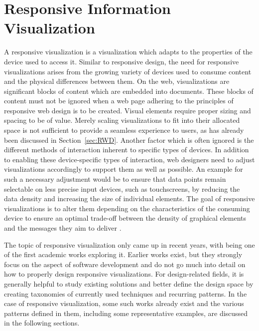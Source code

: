 \chapter{Responsive Information Visualization}

A responsive visualization is a visualization which adapts to the properties of the device used to access it.
Similar to responsive design, the need for responsive visualizations arises from the growing variety of devices used to consume content and the physical differences between them.
On the web, visualizations are significant blocks of content which are embedded into documents.
These blocks of content must not be ignored when a web page adhering to the principles of responsive web design is to be created.
Visual elements require proper sizing and spacing to be of value.
Merely scaling visualizations to fit into their allocated space is not sufficient to provide a seamless experience to users, as has already been discussed in Section~\ref{sec:RWD}.
Another factor which is often ignored is the different methods of interaction inherent to specific types of devices.
In addition to enabling these device-specific types of interaction, web designers need to adjust visualizations accordingly to support them as well as possible.
An example for such a necessary adjustment would be to ensure that data points remain selectable on less precise input devices, such as touchscreens, by reducing the data density and increasing the size of individual elements.
The goal of responsive visualizations is to alter them depending on the characteristics of the consuming device to ensure an optimal trade-off between the density of graphical elements and the messages they aim to deliver \parencite{DesignPatternsTradeOffsRespVis}. 

The topic of responsive visualization only came up in recent years, with \cite{RespVis} being one of the first academic works exploring it.
Earlier works \parencite{BuildingRespDataVisForTheWeb,LearningRespDataVis} exist, but they strongly focus on the aspect of software development and do not go much into detail on how to properly design responsive visualizations.
 For design-related fields, it is generally helpful to study existing solutions and better define the design space by creating taxonomies of currently used techniques and recurring patterns.
In the case of responsive visualization, some such works already exist \parencite{TechniquesForFlexibleRespVisDesign,DesignPatternsTradeOffsRespVis,RespVisSurvey} and the various patterns defined in them, including some representative examples, are discussed in the following sections.


